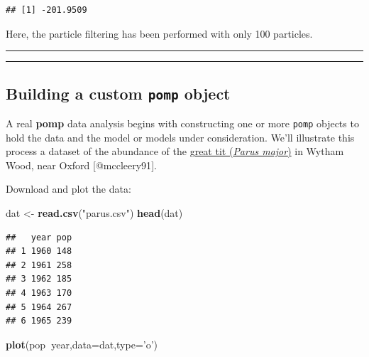 \documentclass[]{article}
\newenvironment{Shaded}{\begin{snugshade}}{\end{snugshade}}
\newcommand{\KeywordTok}[1]{\textcolor[rgb]{0.13,0.29,0.53}{\textbf{#1}}}
\newcommand{\DataTypeTok}[1]{\textcolor[rgb]{0.13,0.29,0.53}{#1}}
\newcommand{\StringTok}[1]{\textcolor[rgb]{0.31,0.60,0.02}{#1}}
\newcommand{\OperatorTok}[1]{\textcolor[rgb]{0.81,0.36,0.00}{\textbf{#1}}}
\newcommand{\NormalTok}[1]{#1}
\begin{document}
\begin{verbatim}
## [1] -201.9509
\end{verbatim}

Here, the particle filtering has been performed with only 100 particles.

\begin{center}\rule{0.5\linewidth}{\linethickness}\end{center}

\begin{center}\rule{0.5\linewidth}{\linethickness}\end{center}

\subsection{\texorpdfstring{Building a custom \texttt{pomp}
object}{Building a custom pomp object}}\label{building-a-custom-pomp-object}

A real \textbf{pomp} data analysis begins with constructing one or more
\texttt{pomp} objects to hold the data and the model or models under
consideration. We'll illustrate this process a dataset of the abundance
of the \href{https://en.wikipedia.org/wiki/Great_tit}{great tit
(\emph{Parus major})} in Wytham Wood, near Oxford {[}@mccleery91{]}.

Download and plot the data:

\begin{Shaded}
\begin{Highlighting}[]
\NormalTok{dat <-}\StringTok{ }\KeywordTok{read.csv}\NormalTok{(}\StringTok{"parus.csv"}\NormalTok{)}
\KeywordTok{head}\NormalTok{(dat)}
\end{Highlighting}
\end{Shaded}

\begin{verbatim}
##   year pop
## 1 1960 148
## 2 1961 258
## 3 1962 185
## 4 1963 170
## 5 1964 267
## 6 1965 239
\end{verbatim}

\begin{Shaded}
\begin{Highlighting}[]
\KeywordTok{plot}\NormalTok{(pop}\OperatorTok{~}\NormalTok{year,}\DataTypeTok{data=}\NormalTok{dat,}\DataTypeTok{type=}\StringTok{'o'}\NormalTok{)}
\end{Highlighting}
\end{Shaded}
\end{document}
